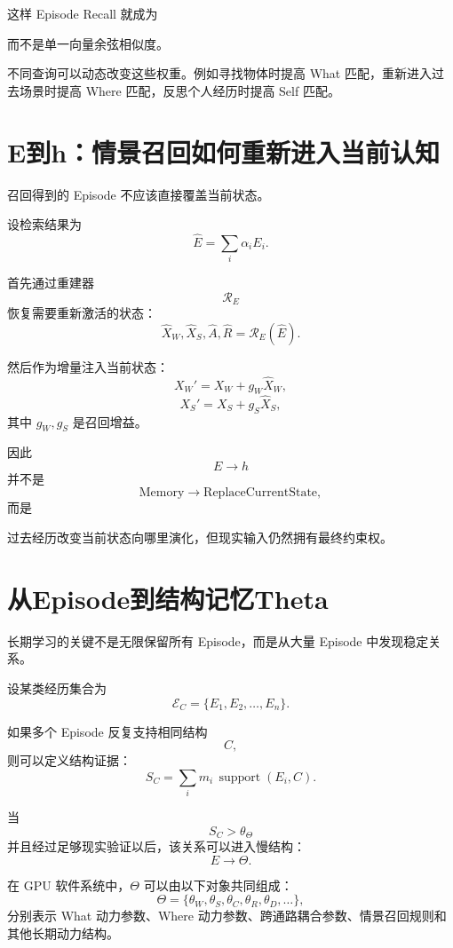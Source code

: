 这样 Episode Recall 就成为
\begin{statementbox}
\centering
{}
\end{statementbox}
而不是单一向量余弦相似度。

不同查询可以动态改变这些权重。例如寻找物体时提高 What 匹配，重新进入过去场景时提高 Where 匹配，反思个人经历时提高 Self 匹配。

\section{E到h：情景召回如何重新进入当前认知}

召回得到的 Episode 不应该直接覆盖当前状态。

设检索结果为
\[
\hat E
=
\sum_i \alpha_iE_i.
\]

首先通过重建器
\[
\mathcal R_E
\]
恢复需要重新激活的状态：
\[
\hat X_W,
\hat X_S,
\hat A,
\hat R
=
\mathcal R_E(\hat E).
\]

然后作为增量注入当前状态：
\[
X_W'
=
X_W
+
g_W\hat X_W,
\]
\[
X_S'
=
X_S
+
g_S\hat X_S,
\]
其中 $g_W,g_S$ 是召回增益。

因此
\[
E\rightarrow h
\]
并不是
\[
\mathrm{Memory}
\rightarrow
\mathrm{ReplaceCurrentState},
\]
而是
\begin{statementbox}
\centering
{}
\end{statementbox}

过去经历改变当前状态向哪里演化，但现实输入仍然拥有最终约束权。

\section{从Episode到结构记忆Theta}

长期学习的关键不是无限保留所有 Episode，而是从大量 Episode 中发现稳定关系。

设某类经历集合为
\[
\mathcal E_C
=
\{
E_1,E_2,\ldots,E_n
\}.
\]

如果多个 Episode 反复支持相同结构
\[
C,
\]
则可以定义结构证据：
\[
S_C
=
\sum_i
m_i
\,\operatorname{support}(E_i,C).
\]

当
\[
S_C>\theta_\Theta
\]
并且经过足够现实验证以后，该关系可以进入慢结构：
\[
\boxed{
E\rightarrow\Theta.
}
\]

在 GPU 软件系统中，$\Theta$ 可以由以下对象共同组成：
\[
\Theta
=
\{
\theta_W,
\theta_S,
\theta_C,
\theta_R,
\theta_D,
\ldots
\},
\]
分别表示 What 动力参数、Where 动力参数、跨通路耦合参数、情景召回规则和其他长期动力结构。

